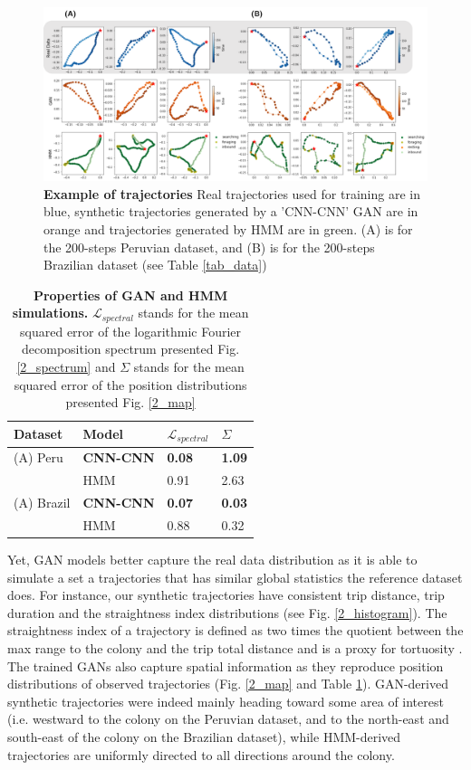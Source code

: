\documentclass{article}
\begin{document}
\begin{figure}[ht]
  \centering
  \includegraphics[scale=0.5]{2_trajectory.png}
  \caption{\textbf{Example of trajectories} Real trajectories used for training are in blue, synthetic trajectories generated by a 'CNN-CNN' GAN are in orange and trajectories generated by HMM are in green. (A) is for the 200-steps Peruvian dataset, and (B) is for the 200-steps Brazilian dataset (see Table \ref{tab_data}) }
  \label{2_trajectory}
\end{figure}

\begin{table}[h]
  \centering
  \caption{\textbf{Properties of GAN and HMM simulations.}  $\mathcal{L}_{spectral}$ stands for the mean squared error of the logarithmic Fourier decomposition spectrum presented Fig. \ref{2_spectrum} and $\Sigma$ stands for the mean squared error of the position distributions presented Fig. \ref{2_map}}
  \begin{tabular}{llll}
    \toprule
    Dataset  &  Model & $\mathcal{L}_{spectral}$ & $\Sigma$ \\
    \midrule
    (A) Peru & \textbf{CNN-CNN} & \textbf{0.08} & \textbf{1.09}\\
     & HMM & 0.91 & 2.63 \\
    \midrule
    (A) Brazil  & \textbf{CNN-CNN} & \textbf{0.07} & \textbf{0.03}\\
     & HMM & 0.88 & 0.32 \\
    \bottomrule
  \end{tabular}
  \label{tab_score_2}
\end{table}

Yet, GAN models better capture the real data distribution as it is able to simulate a set a trajectories that has similar global statistics the reference dataset does. For instance, our synthetic trajectories have consistent trip distance, trip duration and the straightness index distributions (see Fig. \ref{2_histogram}). The straightness index of a trajectory is defined as two times the quotient between the max range to the colony and the trip total distance and is a proxy for tortuosity \citep{benhamou_how_2004}. The trained GANs also capture spatial information as they reproduce position distributions of observed trajectories (Fig. \ref{2_map} and Table \ref{tab_score_2}). GAN-derived synthetic trajectories were indeed mainly heading toward some area of interest (i.e. westward to the colony on the Peruvian dataset, and to the north-east and south-east of the colony on the Brazilian dataset), while HMM-derived trajectories are uniformly directed to all directions around the colony.
\end{document}

